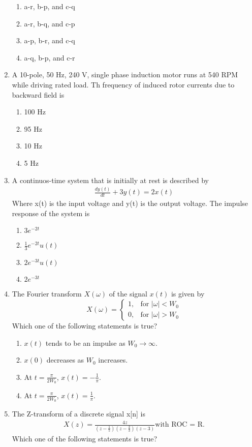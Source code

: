 \documentclass[journal]{IEEEtran}
\numberwithin{equation}{enumi}
\numberwithin{figure}{enumi}
\begin{document}
\begin{enumerate}
\begin{enumerate}
        \item a-r, b-p, and c-q
        \item a-r, b-q, and c-p
        \item a-p, b-r, and c-q
        \item a-q, b-p, and c-r
\end{enumerate}
\bigskip
\item A 10-pole, 50 Hz, 240 V, single phase induction motor runs at 540 RPM while driving rated load. Th frequency of induced rotor currents due to backward field is 
\begin{multicols}{2}
    \begin{enumerate}
        \item 100 Hz
        \item  95 Hz
        \item 10 Hz
        \item 5 Hz
    \end{enumerate}
\end{multicols}
\bigskip
\item A continuos-time system that is initially at rest is described by 
\begin{align*}
    \frac{dy(t)}{dt}+3y(t)=2x(t)
\end{align*}
Where x(t) is the input voltage and y(t) is the output voltage. The impulse response of the system is 
\begin{enumerate}
        \item $3e^{-2t}$
        \item $\frac{1}{3}e^{-2t}u(t)$
        \item $2e^{-3t}u(t)$
        \item $2e^{-3t}$
\end{enumerate}
\bigskip
\item The Fourier transform $X(\omega)$ of the signal $x(t)$ is given by
\[
X(\omega) =
\begin{cases}
1, & \text{for } |\omega| < W_0 \\
0, & \text{for } |\omega| > W_0
\end{cases}
\]
Which one of the following statements is true?
\begin{enumerate}
    \item $x(t)$ tends to be an impulse as $W_0 \to \infty$.
    \item $x(0)$ decreases as $W_0$ increases.
    \item At $t = \frac{\pi}{2W_0}$, $x(t) = -\frac{1}{\pi}$.
    \item At $t = \frac{\pi}{2W_0}$, $x(t) = \frac{1}{\pi}$.
\end{enumerate}
\bigskip
\item The Z-transform of a discrete signal x[n] is 
\begin{align*}
    X(z)=\frac{4z}{(z-\frac{1}{5})(z-\frac{2}{3})(z-3)} \text{with ROC = R.}
\end{align*}
Which one of the following statements is true?
\begin{enumerate}


\end{enumerate}
\end{enumerate}
\end{document}
